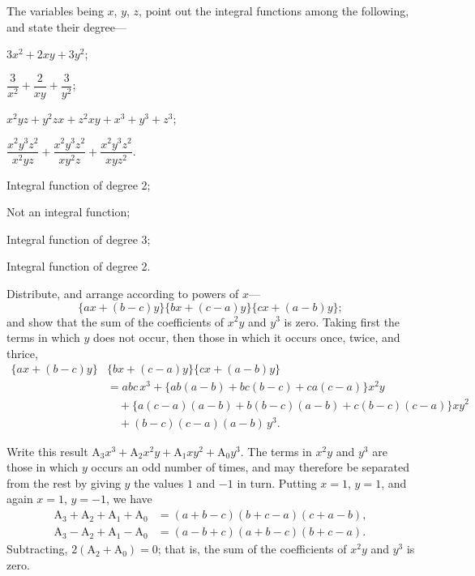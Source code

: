 \documentclass[DIN, pagenumber=false, fontsize=11pt, parskip=half]{scrartcl}
\begin{document}
\begin{problems}[from=1,step=1]
    \problem[1] The variables being $x$, $y$, $z$, point out the integral functions among the following, and state their degree---
    \begin{parts}
        \item $3x^2 + 2xy + 3y^2$;
        \item $\dfrac{3}{x^2} + \dfrac{2}{xy} + \dfrac{3}{y^2}$;
        \item $x^2yz + y^2zx + z^2xy + x^3 + y^3 + z^3$;
        \item $\dfrac{x^2y^3z^2}{x^2yz} + \dfrac{x^2y^3z^2}{xy^2z} + \dfrac{x^2y^3z^2}{xyz^2}$.
    \end{parts}
    
    \answer 
    \begin{parts}
        \item Integral function of degree 2;
        \item Not an integral function;
        \item Integral function of degree 3;
        \item Integral function of degree 2.
    \end{parts}


    \problem[8] Distribute, and arrange according to powers of $x$---
    \[
        \{ax+(b-c)y\}\{bx+(c-a)y\}\{cx+(a-b)y\};
    \]
    and show that the sum of the coefficients of $x^2y$ and $y^3$ is zero.
    \answer
    Taking first the terms in which $y$ does not occur, then those in which it occurs once, twice, and thrice,
    \begin{align*}
        \{ax+(b-c)y\}&\{bx+(c-a)y\}\{cx+(a-b)y\}\\
        &= abc\,x^3 + \{ab(a-b) + bc(b-c) + ca(c-a)\}x^2y\\
        &\quad + \{a(c-a)(a-b) + b(b-c)(a-b) + c(b-c)(c-a)\}xy^2\\
        &\quad + (b-c)(c-a)(a-b)\,y^3 .
    \end{align*}

    Write this result $\mathrm{A}_3x^3 + \mathrm{A}_2x^2y + \mathrm{A}_1xy^2 + \mathrm{A}_0y^3$.
    The terms in $x^2y$ and $y^3$ are those in which $y$ occurs an odd number of times, and may therefore be separated from the rest by giving $y$ the values $1$ and $-1$ in turn.
    Putting $x=1$, $y=1$, and again $x=1$, $y=-1$, we have
    \begin{align*}
        \mathrm{A}_3 + \mathrm{A}_2 + \mathrm{A}_1 + \mathrm{A}_0 &= (a+b-c)(b+c-a)(c+a-b),\\
        \mathrm{A}_3 - \mathrm{A}_2 + \mathrm{A}_1 - \mathrm{A}_0 &= (a-b+c)(a+b-c)(b+c-a).
    \end{align*}
    Subtracting, $2(\mathrm{A}_2 + \mathrm{A}_0) = 0$; that is, the sum of the coefficients of $x^2y$ and $y^3$ is zero.


\end{problems}
\end{document}
